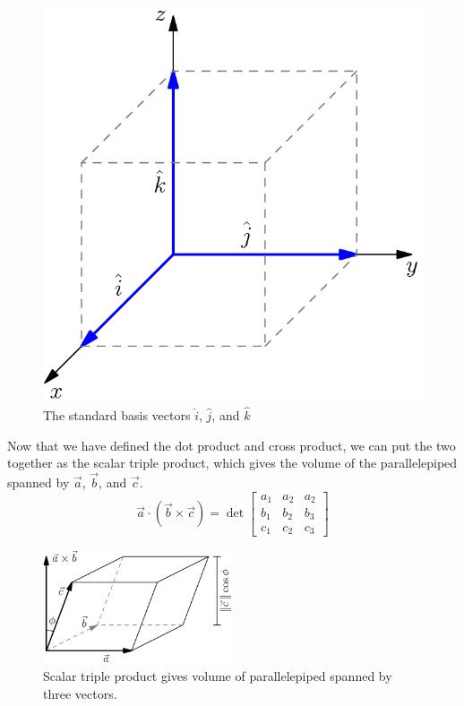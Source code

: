\begin{figure}[H]
	\centering
	\includegraphics[scale=0.33]{./Images/backgroundReview/UnitVectors.png}
	\caption{The standard basis vectors $\hat{i}$, $\hat{j}$, and $\hat{k}$}
\end{figure}




\noindent
Now that we have defined the dot product and cross product, we can put the two together as the scalar triple product, which gives the volume of the parallelepiped spanned by $\vec{a}$, $\vec{b}$, and $\vec{c}$.
\begin{equation*}
	\vec{a}\cdot\left(\vec{b}\times\vec{c}\right) = \det\begin{bmatrix}
		a_1 & a_2 & a_2 \\
		b_1 & b_2 & b_3 \\
		c_1 & c_2 & c_3
	\end{bmatrix}
\end{equation*}

\begin{figure}[H]
	\centering
	\includegraphics[width=0.5\textwidth]{./Images/backgroundReview/Parallelipiped.png}
	\caption{Scalar triple product gives volume of parallelepiped spanned by three vectors.}
\end{figure}
